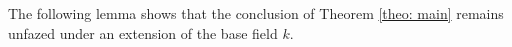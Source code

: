 \documentclass[a4paper, 11pt]{article}
\begin{document}
The following lemma shows that the conclusion of Theorem \ref{theo: main} remains unfazed under an extension of the base field $k$.
%
%
\end{document}
